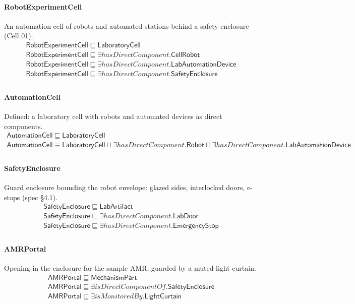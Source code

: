 \documentclass[10pt]{article}
\begin{document}
\paragraph{RobotExperimentCell} An automation cell of robots and automated stations behind a safety enclosure (Cell 01).
\[\begin{array}{l}
\mathsf{RobotExperimentCell} \sqsubseteq  \mathsf{LaboratoryCell} \\
\mathsf{RobotExperimentCell} \sqsubseteq  \exists \mathit{hasDirectComponent}.\mathsf{CellRobot} \\
\mathsf{RobotExperimentCell} \sqsubseteq  \exists \mathit{hasDirectComponent}.\mathsf{LabAutomationDevice} \\
\mathsf{RobotExperimentCell} \sqsubseteq  \exists \mathit{hasDirectComponent}.\mathsf{SafetyEnclosure} \\
\end{array}\]
\paragraph{AutomationCell} Defined: a laboratory cell with robots and automated devices as direct components.
\[\begin{array}{l}
\mathsf{AutomationCell} \sqsubseteq  \mathsf{LaboratoryCell} \\
\mathsf{AutomationCell} \equiv  \mathsf{LaboratoryCell} \sqcap  \exists \mathit{hasDirectComponent}.\mathsf{Robot} \sqcap  \exists \mathit{hasDirectComponent}.\mathsf{LabAutomationDevice} \\
\end{array}\]
\paragraph{SafetyEnclosure} Guard enclosure bounding the robot envelope: glazed sides, interlocked doors, e-stops (spec §4.1).
\[\begin{array}{l}
\mathsf{SafetyEnclosure} \sqsubseteq  \mathsf{LabArtifact} \\
\mathsf{SafetyEnclosure} \sqsubseteq  \exists \mathit{hasDirectComponent}.\mathsf{LabDoor} \\
\mathsf{SafetyEnclosure} \sqsubseteq  \exists \mathit{hasDirectComponent}.\mathsf{EmergencyStop} \\
\end{array}\]
\paragraph{AMRPortal} Opening in the enclosure for the sample AMR, guarded by a muted light curtain.
\[\begin{array}{l}
\mathsf{AMRPortal} \sqsubseteq  \mathsf{MechanismPart} \\
\mathsf{AMRPortal} \sqsubseteq  \exists \mathit{isDirectComponentOf}.\mathsf{SafetyEnclosure} \\
\mathsf{AMRPortal} \sqsubseteq  \exists \mathit{isMonitoredBy}.\mathsf{LightCurtain} \\
\end{array}\]
\end{document}
